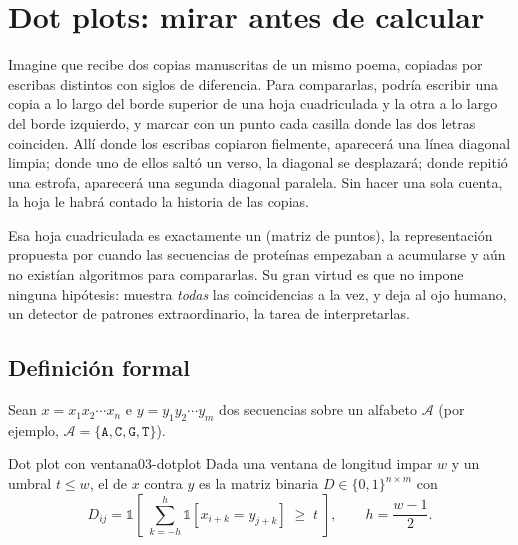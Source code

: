 \section{Dot plots: mirar antes de calcular}\label{sec:03-dotplot}

\begin{intuicion}
Imagine que recibe dos copias manuscritas de un mismo poema, copiadas por escribas distintos con siglos de diferencia. Para compararlas, podría escribir una copia a lo largo del borde superior de una hoja cuadriculada y la otra a lo largo del borde izquierdo, y marcar con un punto cada casilla donde las dos letras coinciden. Allí donde los escribas copiaron fielmente, aparecerá una línea diagonal limpia; donde uno de ellos saltó un verso, la diagonal se desplazará; donde repitió una estrofa, aparecerá una segunda diagonal paralela. Sin hacer una sola cuenta, la hoja le habrá contado la historia de las copias.
\end{intuicion}

Esa hoja cuadriculada es exactamente un  (matriz de puntos), la representación propuesta por \textcite{c03-gibbs1970} cuando las secuencias de proteínas empezaban a acumularse y aún no existían algoritmos para compararlas. Su gran virtud es que no impone ninguna hipótesis: muestra \emph{todas} las coincidencias a la vez, y deja al ojo humano, un detector de patrones extraordinario, la tarea de interpretarlas.

\subsection{Definición formal}

Sean $x = x_1x_2\cdots x_n$ e $y = y_1y_2\cdots y_m$ dos secuencias sobre un alfabeto $\mathcal{A}$ (por ejemplo, $\mathcal{A}=\{\texttt{A},\texttt{C},\texttt{G},\texttt{T}\}$).

\begin{definicion}{Dot plot con ventana}{03-dotplot}
Dada una ventana de longitud impar $w$ y un umbral $t \le w$, el  de $x$ contra $y$ es la matriz binaria $D \in \{0,1\}^{n\times m}$ con
\begin{equation}\label{eq:03-dotplot}
D_{ij} = \mathbb{1}\!\left[\;\sum_{k=-h}^{h} \mathbb{1}\left[x_{i+k} = y_{j+k}\right] \;\ge\; t\;\right],\qquad h=\frac{w-1}{2}.
\end{equation}
\end{definicion}

